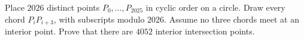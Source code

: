 Place $2026$ distinct points $P_0,\ldots,P_{2025}$ in cyclic order on a circle. Draw every chord $P_iP_{i+3}$, with subscripts modulo $2026$. Assume no three chords meet at an interior point. Prove that there are $4052$ interior intersection points.
